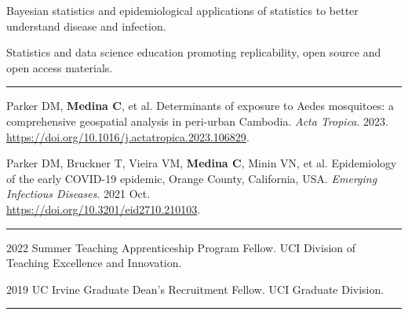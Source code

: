 \documentclass{article}
\begin{document}


\begin{description}
	\vspace{-2mm}
	\item[Research Interests]\hspace*{.1in}
		
		Bayesian statistics and epidemiological applications of statistics to better understand disease and infection.
		
		Statistics and data science education promoting replicability, open source and open access materials.
		
\end{description}
\vspace{-2mm}
\rule{\linewidth}{1pt}




\begin{description}
	\vspace{-2mm}
	\item[Publications]\hspace*{.1in} 
	
		Parker DM, \textbf{Medina C}, et al. Determinants of exposure to Aedes mosquitoes: a comprehensive geospatial analysis in peri-urban Cambodia. \textit{Acta Tropica}. 2023.\\  
		\url{https://doi.org/10.1016/j.actatropica.2023.106829}.
		\vspace*{1mm}
			
		Parker DM, Bruckner T, Vieira VM, \textbf{Medina C}, Minin VN, et al. Epidemiology of the early COVID-19 epidemic, Orange County, California, USA. \textit{Emerging Infectious Diseases}. 2021 Oct.\\ \url{https://doi.org/10.3201/eid2710.210103}. 

\end{description}
\vspace{-2mm}
\rule{\linewidth}{1pt}





\begin{description}
	\vspace{-2mm}
	\item[Fellowships]\hspace*{.1in}

		2022 Summer Teaching Apprenticeship Program Fellow. UCI Division of Teaching Excellence and Innovation.
		\vspace*{1mm}
		
		2019 UC Irvine Graduate Dean's Recruitment Fellow. UCI Graduate Division.

\end{description}
\vspace{-2mm}
\rule{\linewidth}{1pt}
\end{document}
